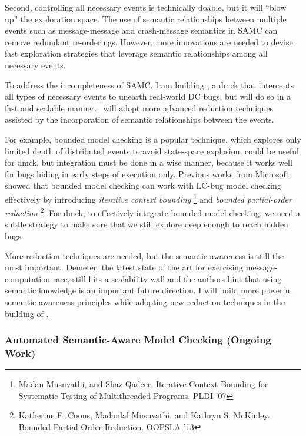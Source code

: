 \documentclass[11pt]{article}
\begin{document}
Second, controlling all necessary events is technically doable, but it will
``blow up'' the exploration space. The use of semantic relationships between
multiple events such as message-message and crash-message semantics in SAMC can
remove redundant re-orderings. However, more innovations are needed to devise
fast exploration strategies that leverage semantic relationships among all
necessary events.

To address the incompleteness of SAMC, I am building \fullcheck, a dmck that
intercepts all types of necessary events to unearth real-world DC bugs, but will
do so in a fast and scalable manner. \fullcheck\ will adopt more advanced
reduction techniques assisted by the incorporation of semantic relationships
between the events. 

For example, bounded model checking is a popular technique,
which explores only limited depth of distributed events to avoid state-space
explosion, could be useful for dmck, but integration must be done in a wise
manner, because it works well for bugs hiding in early steps of execution only.
Previous works from Microsoft showed that bounded model checking can work with
LC-bug model checking effectively by introducing \textit{iterative context
bounding} \footnote{Madan Musuvathi, and Shaz Qadeer. Iterative Context Bounding
for Systematic Testing of Multithreaded Programs. PLDI '07} and \textit{bounded
partial-order reduction} \footnote{Katherine E. Coons, Madanlal Musuvathi, and
Kathryn S. McKinley. Bounded Partial-Order Reduction. OOPSLA '13}. For dmck, to
effectively integrate bounded model checking, we need a subtle strategy to make
sure that we still explore deep enough to reach hidden bugs.
\fi

More reduction techniques are needed, but the semantic-awareness is still the
most important. Demeter, the latest state of the art for exercising
message-computation race, still hits a scalability wall and the authors hint
that using semantic knowledge is an important future direction. I will build
more powerful semantic-awareness principles while adopting new reduction
techniques in the building of \fullcheck.


\subsubsection*{Automated Semantic-Aware Model Checking (Ongoing Work)} 
\end{document}

